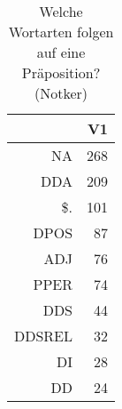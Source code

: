 \begin{table}[ht]
\centering
\begin{tabular}{rr}
  \hline
 & V1 \\ 
  \hline
NA & 268 \\ 
  DDA & 209 \\ 
  \$. & 101 \\ 
  DPOS &  87 \\ 
  ADJ &  76 \\ 
  PPER &  74 \\ 
  DDS &  44 \\ 
  DDSREL &  32 \\ 
  DI &  28 \\ 
  DD &  24 \\ 
   \hline
\end{tabular}
\caption{Welche Wortarten folgen auf eine Präposition?  (Notker)} 
\end{table}
